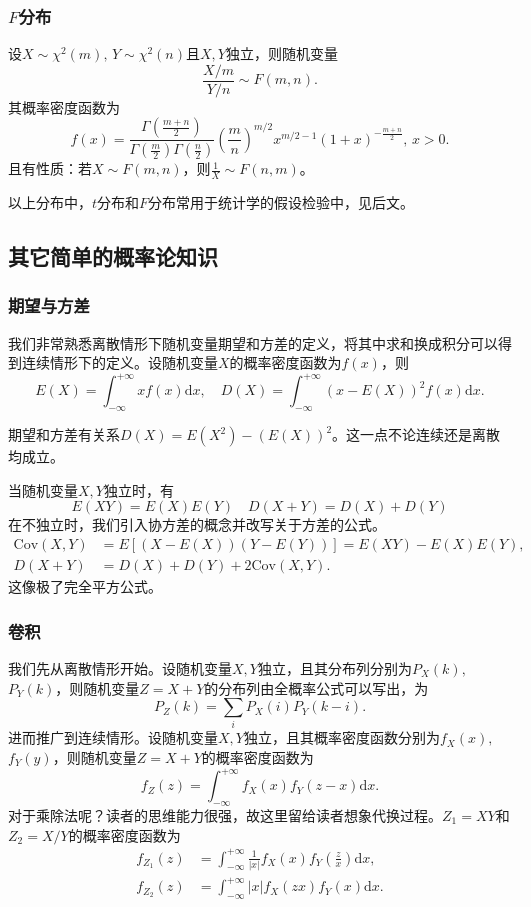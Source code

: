 \documentclass[a4paper, 12pt]{article}
\begin{document}
    \subsubsection{$F$分布}
    设$X\sim\chi^2(m),\,Y\sim\chi^2(n)$且$X,Y$独立，则随机变量
    \[
    \frac{X/m}{Y/n}\sim F(m,n).
    \]
    其概率密度函数为
    \[
    f(x)=\frac{\Gamma\left(\frac{m+n}{2}\right)}{\Gamma\left(\frac{m}{2}\right)\Gamma\left(\frac{n}{2}\right)}\left(\frac{m}{n}\right)^{m/2}x^{m/2-1}(1+x)^{-\frac{m+n}{2}},\,x>0.
    \]
    且有性质：若$X\sim F(m,n)$，则$\frac{1}{X}\sim F(n,m)$。

    以上分布中，$t$分布和$F$分布常用于统计学的假设检验中，见后文。

    \subsection{其它简单的概率论知识}

    \subsubsection{期望与方差}
    我们非常熟悉离散情形下随机变量期望和方差的定义，将其中求和换成积分可以得到连续情形下的定义。设随机变量$X$的概率密度函数为$f(x)$，则
    \[
    E(X)=\int_{-\infty}^{+\infty}xf(x)\mathrm dx,\quad D(X)=\int_{-\infty}^{+\infty}(x-E(X))^2f(x)\mathrm dx.
    \]

    期望和方差有关系$D(X)=E(X^2)-(E(X))^2$。这一点不论连续还是离散均成立。

    当随机变量$X,Y$独立时，有
    \[
    E(XY)=E(X)E(Y)\quad D(X+Y)=D(X)+D(Y)
    \]
    在不独立时，我们引入协方差的概念并改写关于方差的公式。
    \begin{align*}
        \mathrm{Cov}(X,Y)&=E\left[(X-E(X))(Y-E(Y))\right]=E(XY)-E(X)E(Y),\\
        D(X+Y)&=D(X)+D(Y)+2\mathrm{Cov}(X,Y).
    \end{align*}
    这像极了完全平方公式。
    
    \subsubsection{卷积}
    我们先从离散情形开始。设随机变量$X,Y$独立，且其分布列分别为$P_X(k),$ $P_Y(k)$，则随机变量$Z=X+Y$的分布列由全概率公式可以写出，为
    \[
    P_Z(k)=\sum_{i}P_X(i)P_Y(k-i).
    \]
    进而推广到连续情形。设随机变量$X,Y$独立，且其概率密度函数分别为$f_X(x),$ $f_Y(y)$，则随机变量$Z=X+Y$的概率密度函数为
    \[
    f_Z(z)=\int_{-\infty}^{+\infty}f_X(x)f_Y(z-x)\mathrm dx.
    \]
    对于乘除法呢？读者的思维能力很强，故这里留给读者想象代换过程。$Z_1=XY$和$Z_2=X/Y$的概率密度函数为
    \begin{align*}
        f_{Z_1}(z)&=\int_{-\infty}^{+\infty}\frac{1}{|x|}f_X(x)f_Y\left(\frac{z}{x}\right)\mathrm dx,\\
        f_{Z_2}(z)&=\int_{-\infty}^{+\infty}|x|f_X(zx)f_Y(x)\mathrm dx.
    \end{align*}
\end{document}
